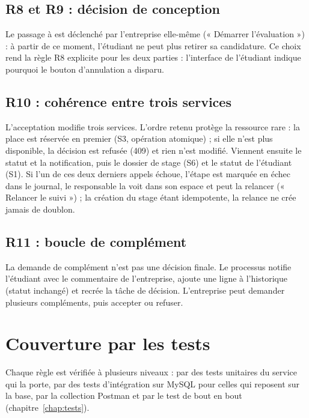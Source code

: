 \subsection{R8 et R9 : décision de conception}
Le passage à  est déclenché par l'entreprise elle-même (« Démarrer l'évaluation ») : à partir de ce moment, l'étudiant ne peut plus retirer sa candidature. Ce choix rend la règle R8 explicite pour les deux parties : l'interface de l'étudiant indique pourquoi le bouton d'annulation a disparu.

\subsection{R10 : cohérence entre trois services}
L'acceptation modifie trois services. L'ordre retenu protège la ressource rare : la place est réservée en premier (S3, opération atomique) ; si elle n'est plus disponible, la décision est refusée (409) et rien n'est modifié. Viennent ensuite le statut  et la notification, puis le dossier de stage (S6) et le statut de l'étudiant (S1). Si l'un de ces deux derniers appels échoue, l'étape est marquée en échec dans le journal, le responsable la voit dans son espace et peut la relancer (« Relancer le suivi ») ; la création du stage étant idempotente, la relance ne crée jamais de doublon.

\subsection{R11 : boucle de complément}
La demande de complément n'est pas une décision finale. Le processus notifie l'étudiant avec le commentaire de l'entreprise, ajoute une ligne à l'historique (statut inchangé) et recrée la tâche de décision. L'entreprise peut demander plusieurs compléments, puis accepter ou refuser.

\section{Couverture par les tests}

Chaque règle est vérifiée à plusieurs niveaux : par des tests unitaires du service qui la porte, par des tests d'intégration sur MySQL pour celles qui reposent sur la base, par la collection Postman et par le test de bout en bout (chapitre~\ref{chap:tests}).

